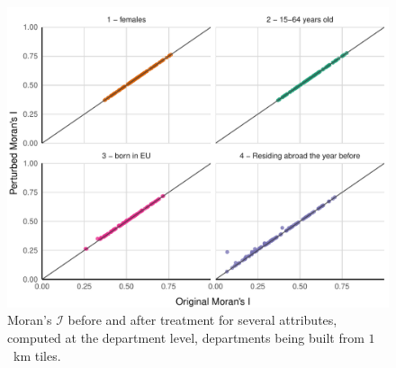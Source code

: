 \begin{figure}[H]
    \centering
    \includegraphics[width=\linewidth]{figures/Quadtree/carr_1km_moran_depts_4var_en_fix.pdf}
    \caption{Moran's $\mathcal{I}$ before and after treatment for several attributes, computed at the department level, departments being built from $1$~km tiles.}
    \label{fig:moran-depts}
\end{figure}

\newpage

